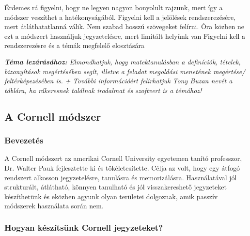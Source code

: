 \documentclass[../Main.tex]{subfiles}
\begin{document}
\begin{flushleft}
    Érdemes rá figyelni, hogy ne legyen nagyon bonyolult rajzunk, mert így a módszer veszíthet a hatékonyságából.
    Figyelni kell a jelölések rendszerezésére, mert átláthatatlanná válik.
    Nem szabad hosszú szövegeket felírni.
    Óra közben ne ezt a módszert használjuk jegyzetelésre, mert limitált helyünk van
    Figyelni kell a rendszerezésre és a témák megfelelő elosztására
\end{flushleft}
\textit{\textbf{Téma lezárásához:} Elmondhatjuk, hogy matektanulásban a definíciók, tételek, bizonyítások megértésében segít, illetve a feladat megoldási menetének megértése/ feltérképezésében is.
+ További információért felírhatjuk Tony Buzan nevét a táblára, ha rákeresnek találnak irodalmat és szoftvert is a témához!}

\subsection{A Cornell módszer}

\subsubsection{Bevezetés}

\begin{flushleft}
A Cornell módszert az amerikai Cornell University egyetemen tanító professzor, Dr.
Walter Pauk fejlesztette ki és tökéletesítette. Célja az volt, hogy egy átfogó rendszert
alkosson jegyzetelésre, tanulásra és memorizálásra. Használatával jól strukturált,
átlátható, könnyen tanulható és jól visszakereshető jegyzeteket készíthetünk és eközben
agyunk olyan területei dolgoznak, amik passzív módszerek használata során nem.
\end{flushleft}

\subsubsection{Hogyan készítsünk Cornell jegyzeteket?}

\end{document}
